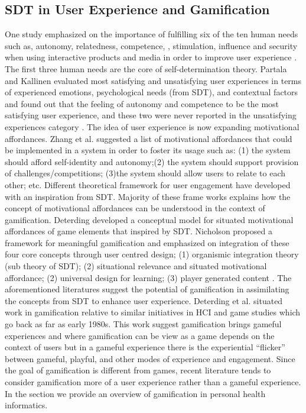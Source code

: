 \documentclass{sig-alternate}
\begin{document}
\subsection{SDT in User Experience and Gamification}
One study emphasized on the importance of fulfilling six of the ten human needs such as, autonomy, relatedness, competence, , stimulation,  influence and security when using interactive products and media in order to improve user experience \cite{wiklund2009:needs}. The first three human needs are the core of self-determination theory. Partala and Kallinen evaluated most satisfying and unsatisfying user experiences in terms of experienced emotions, psychological needs (from SDT), and contextual factors and found out that the feeling of autonomy and competence to be the most satisfying user experience, and these two were never reported in the unsatisfying experiences category \cite{partala2012:understanding} .\newline 
The idea of user experience is now expanding motivational affordances. Zhang et al.\cite{zhang2008:motivational} suggested a list of motivational affordances that could be implemented in a system in order to foster its usage such as: (1) the system should afford self-identity and autonomy;(2) the system should support provision of challenges/competitions; (3)the system should allow users to relate to each other; etc. Different theoretical framework for user engagement have developed with an inspiration from SDT. Majority of these frame works explains how the concept of motivational affordances can be understood in the context of gamification. Deterding \cite{deterding2011:situated} developed  a conceptual model for situated motivational affordances of game elements that inspired by SDT. Nicholson proposed a framework for meaningful gamification and emphasized on integration of these four core concepts through user centred design; (1) organismic integration theory (sub theory of SDT); (2) situational relevance and situated motivational affordance; (2) universal design for learning; (3) player generated content . The aforementioned literatures suggest the potential of gamification in assimilating the concepts from SDT to enhance user experience.\newline 
Deterding et al. \cite{deterding2011game} situated work in gamification relative to similar initiatives in HCI and game studies which go back as far as early 1980s. This work suggest gamification brings gameful experiences and where gamification can be view as a game depends on the context of users but in a gameful experience there is the experiential
``flicker'' between gameful, playful, and other modes of experience and engagement. Since the goal of gamification is different from games, recent literature  tends to consider gamification more of a user experience rather than a gameful experience\cite{seaborn2015:gamification}. In the section we provide an overview of gamification in personal health informatics.
\end{document}
